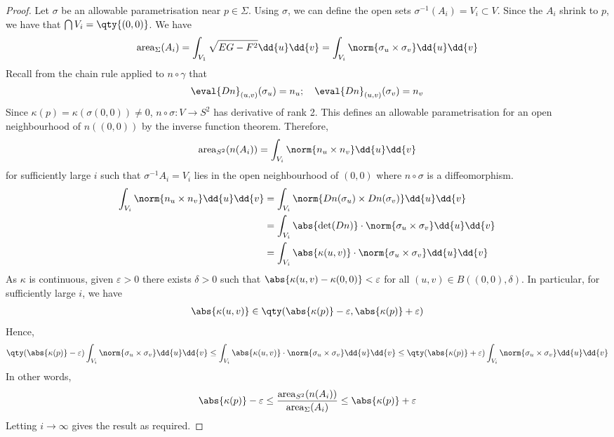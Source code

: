 \begin{proof}
	Let $\sigma$ be an allowable parametrisation near $p \in \Sigma$.
	Using $\sigma$, we can define the open sets $\sigma^{-1}(A_i) = V_i \subset V$.
	Since the $A_i$ shrink to $p$, we have that $\bigcap V_i = \qty{(0,0)}$.
	We have
	\begin{align*}
		\mathrm{area}_\Sigma(A_i) = \int_{V_1} \sqrt{EG - F^2} \dd{u} \dd{v} = \int_{V_i} \norm{\sigma_u \times \sigma_v} \dd{u}\dd{v}
	\end{align*}
	Recall from the chain rule applied to $n \circ \gamma$ that
	\begin{align*}
		\eval{Dn}_{(u,v)}(\sigma_u) = n_u;\quad \eval{Dn}_{(u,v)}(\sigma_v) = n_v
	\end{align*}
	Since $\kappa(p) = \kappa(\sigma(0,0)) \neq 0$, $n \circ \sigma \colon V \to S^2$ has derivative of rank 2.
	This defines an allowable parametrisation for an open neighbourhood of $n((0,0))$ by the inverse function theorem.
	Therefore,
	\begin{align*}
		\mathrm{area}_{S^2}(n(A_i)) = \int_{V_i} \norm{n_u \times n_v} \dd{u} \dd{v}
	\end{align*}
	for sufficiently large $i$ such that $\sigma^{-1} A_i = V_i$ lies in the open neighbourhood of $(0,0)$ where $n \circ \sigma$ is a diffeomorphism.
	\begin{align*}
		\int_{V_i} \norm{n_u \times n_v} \dd{u} \dd{v} & = \int_{V_i} \norm{Dn(\sigma_u) \times Dn(\sigma_v)} \dd{u} \dd{v}                \\
		                                               & = \int_{V_i} \abs{\det (Dn)} \cdot \norm{\sigma_u \times \sigma_v} \dd{u} \dd{v}  \\
		                                               & = \int_{V_i} \abs{\kappa(u,v)} \cdot \norm{\sigma_u \times \sigma_v} \dd{u}\dd{v}
	\end{align*}
	As $\kappa$ is continuous, given $\varepsilon > 0$ there exists $\delta > 0$ such that $\abs{\kappa(u,v) - \kappa(0,0)} < \varepsilon$ for all $(u,v) \in B((0,0), \delta)$.
	In particular, for sufficiently large $i$, we have
	\begin{align*}
		\abs{\kappa(u,v)} \in \qty(\abs{\kappa(p)}-\varepsilon, \abs{\kappa(p)}+\varepsilon)
	\end{align*}
	Hence,
	\begin{align*}
		\qty(\abs{\kappa(p)}-\varepsilon) \int_{V_i} \norm{\sigma_u \times \sigma_v} \dd{u}\dd{v} \leq \int_{V_i} \abs{\kappa(u,v)} \cdot \norm{\sigma_u \times \sigma_v} \dd{u}\dd{v} \leq \qty(\abs{\kappa(p)}+\varepsilon) \int_{V_i} \norm{\sigma_u \times \sigma_v} \dd{u}\dd{v}
	\end{align*}
	In other words,
	\begin{align*}
		\abs{\kappa(p)}-\varepsilon \leq \frac{\mathrm{area}_{S^2} (n(A_i))}{\mathrm{area}_{\Sigma} (A_i)} \leq \abs{\kappa(p)} + \varepsilon
	\end{align*}
	Letting $i \to \infty$ gives the result as required.
\end{proof}

